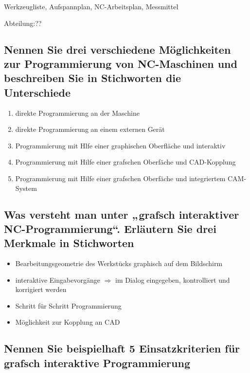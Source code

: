 Werkzeugliste, Aufspannplan, NC-Arbeitsplan, Messmittel

Abteilung:??

\subsection*{%
    Nennen Sie drei verschiedene Möglichkeiten zur Programmierung von
    NC-Maschinen und beschreiben Sie in Stichworten die Unterschiede
}

\begin{enumerate}[1)]
    \item direkte Programmierung an der Maschine
    \item direkte Programmierung an einem externen Gerät
    \item Programmierung mit Hlfe einer graphischen Oberfläche und interaktiv
    \item Programmierung mit Hilfe einer grafschen Oberfäche und CAD-Kopplung
    \item
        Programmierung mit Hilfe einer grafschen Oberfäche und integriertem
        CAM-System
\end{enumerate}

\subsection*{%
    Was versteht man unter „grafsch interaktiver NC-Programmierung“. Erläutern
    Sie drei Merkmale in Stichworten
}

\begin{itemize}
    \item Bearbeitungsgeometrie des Werkstücks graphisch auf dem Bildschirm
    \item
        interaktive Eingabevorgänge $\Rightarrow$ im Dialog eingegeben,
        kontrolliert und korrigiert werden
    \item Schritt für Schritt Programmierung
    \item Möglichkeit zur Kopplung an CAD
\end{itemize}

\subsection*{%
    Nennen Sie beispielhaft 5 Einsatzkriterien für grafsch interaktive
    Programmierung
}

